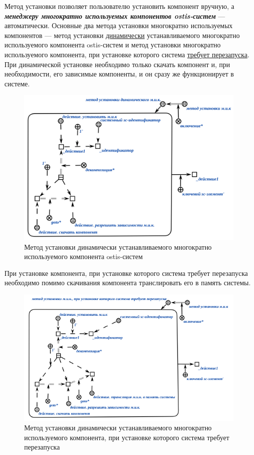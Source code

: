 Метод установки позволяет пользователю установить компонент вручную, а \textbf{\textit{менеджеру многократно используемых компонентов ostis-систем}} --- автоматически. Основные два метода установки многократно используемых компонентов --- метод установки \underline{динамически} устанавливаемого многократно используемого компонента ostis-систем и метод установки многократно используемого компонента, при установке которого система \underline{требует перезапуска}. При динамической установке необходимо только скачать компонент и, при необходимости, его зависимые компоненты, и он сразу же функционирует в системе. 

\begin{figure}[H]
	\includegraphics[scale=0.6]{author/part5/figures/install_dynamic_method.png}
	\caption{Метод установки динамически устанавливаемого многократно используемого компонента ostis-систем}
	\label{fig:dynamic_method}
\end{figure}

При установке компонента, при установке которого система требует перезапуска необходимо помимо скачивания компонента транслировать его в память системы.

\begin{figure}[H]
	\includegraphics[scale=0.6]{author/part5/figures/install_with_reboot_method.png}
	\caption{Метод установки динамически устанавливаемого многократно используемого компонента, при установке которого система требует перезапуска}
	\label{fig:install_with_reboot_method}
\end{figure}


